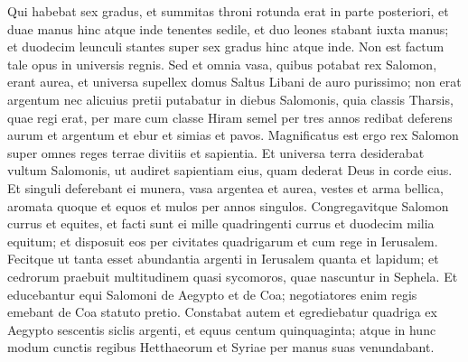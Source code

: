 \begin{biblechapter}
\verse Qui habebat sex gradus, et summitas throni rotunda erat in parte posteriori, et duae manus hinc atque inde tenentes sedile, et duo leones stabant iuxta manus; 
\verse et duodecim leunculi stantes super sex gradus hinc atque inde. Non est factum tale opus in universis regnis. 
\verse Sed et omnia vasa, quibus potabat rex Salomon, erant aurea, et universa supellex domus Saltus Libani de auro purissimo; non erat argentum nec alicuius pretii putabatur in diebus Salomonis, 
\verse quia classis Tharsis, quae regi erat, per mare cum classe Hiram semel per tres annos redibat deferens aurum et argentum et ebur et simias et pavos. 
\verse Magnificatus est ergo rex Salomon super omnes reges terrae divitiis et sapientia. 
\verse Et universa terra desiderabat vultum Salomonis, ut audiret sapientiam eius, quam dederat Deus in corde eius. 
\verse Et singuli deferebant ei munera, vasa argentea et aurea, vestes et arma bellica, aromata quoque et equos et mulos per annos singulos. 
\verse Congregavitque Salomon currus et equites, et facti sunt ei mille quadringenti currus et duodecim milia equitum; et disposuit eos per civitates quadrigarum et cum rege in Ierusalem. 
\verse Fecitque ut tanta esset abundantia argenti in Ierusalem quanta et lapidum; et cedrorum praebuit multitudinem quasi sycomoros, quae nascuntur in Sephela. 
\verse Et educebantur equi Salomoni de Aegypto et de Coa; negotiatores enim regis emebant de Coa statuto pretio. 
\verse Constabat autem et egrediebatur quadriga ex Aegypto sescentis siclis argenti, et equus centum quinquaginta; atque in hunc modum cunctis regibus Hetthaeorum et Syriae per manus suas venundabant. 
\end{biblechapter}

